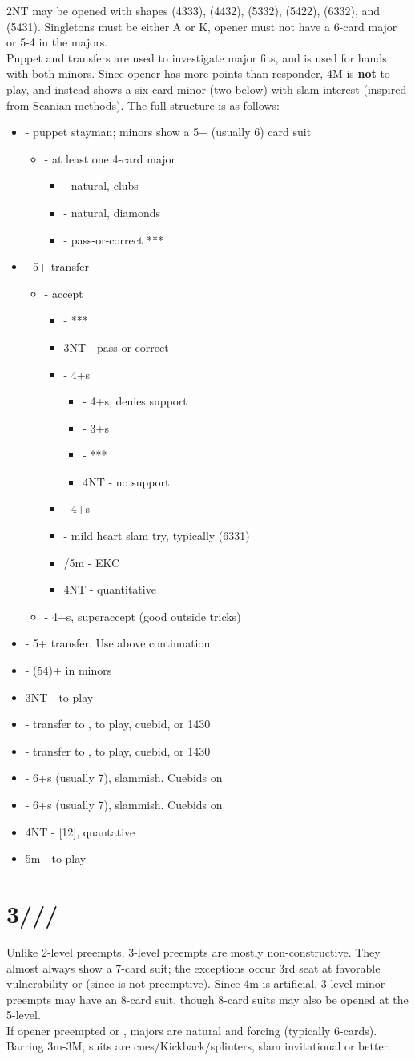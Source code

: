 \documentclass[12pt]{report}
\newcommand{\n}{\\}
\newcommand{\ul}[1]{\begin{itemize}#1\end{itemize}}
\newcommand{\li}{\item[~]}
\newcommand{\bidsection}[2]{\section{\texorpdfstring{#1}{#2}}}
\begin{document}
    2NT may be opened with shapes (4333), (4432), (5332), (5422), (6332), and (5431).  Singletons must be either A or K, opener must not have a 6-card major or 5-4 in the majors.\n
    Puppet and transfers are used to investigate major fits, and  is used for hands with both minors.  Since opener has more points than responder, 4M is \textbf{not} to play, and instead shows a six card minor (two-below) with slam interest (inspired from Scanian methods). The full structure is as follows:
    \ul {
        \li {} - puppet stayman; minors show a 5+ (usually 6) card suit
        \ul {
            \li \di3 - at least one 4-card major
            \ul {
                \li \cl4 - natural, clubs
                \li \di4 - natural, diamonds
                \li \he4 - pass-or-correct ***

            }
        }
        \li \di3 - 5+\he{} transfer
        \ul {
            \li \he3 - accept
            \ul {
                \li \sp3 - ***
                \li 3NT - pass or correct
                \li \cl4 - 4+\cl{}s
                \ul {
                    \li \di4 - 4+\cl{}s, denies \he{} support
                    \li \he4 - 3+\he{}s
                    \li \sp4 - ***
                    \li 4NT - no support
                }
                \li \di4 - 4+\di{}s
                \li \he4 - mild heart slam try, typically (6331)
                \li \sp4/5m - EKC
                \li 4NT - quantitative

            }
            \li \he4 - 4+\he{}s, superaccept (good outside tricks)
        }
        \li \he3 - 5+\sp{} transfer.  Use above continuation
        \li \sp3 - (54)+ in minors
        \li 3NT - to play
        \li \cl4 - transfer to \he4, to play, cuebid, or 1430
        \li \di4 - transfer to \sp4, to play, cuebid, or 1430
        \li \he4 - 6+\cl{}s (usually 7), slammish.  Cuebids on
        \li \sp4 - 6+\di{}s (usually 7), slammish. Cuebids on
        \li 4NT - [12], quantative
        \li 5m - to play
    }
\bidsection{3\cl{}/\di{}/\he{}/\sp{}}{3♣/♢/♡/♠} \label{2:10}

    Unlike 2-level preempts, 3-level preempts are mostly non-constructive.  They almost always show a 7-card suit; the exceptions occur 3rd seat at favorable vulnerability or  (since  is not preemptive).  Since 4m is artificial, 3-level minor preempts may have an 8-card suit, though 8-card suits may also be opened at the 5-level. \n

    If opener preempted  or , majors are natural and forcing (typically 6-cards).  Barring 3m-3M, suits are cues/Kickback/splinters, slam invitational or better.
\end{document}
